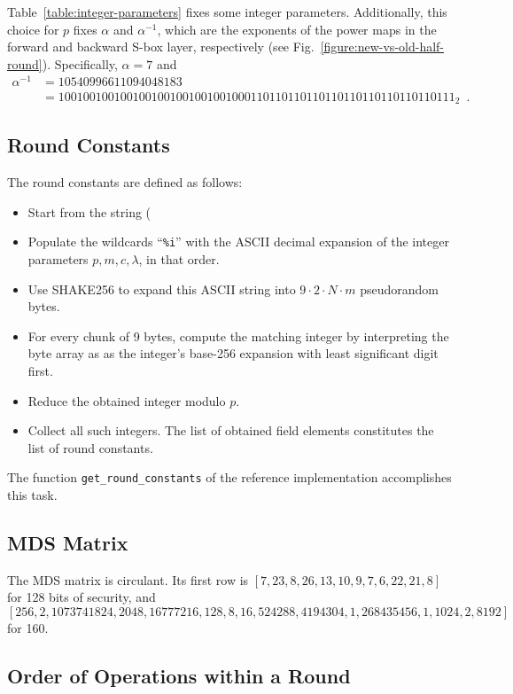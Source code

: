 \documentclass[a4paper]{article}
\begin{document}
Table~\ref{table:integer-parameters} fixes some integer parameters. Additionally, this choice for $p$ fixes $\alpha$ and $\alpha^{-1}$, which are the exponents of the power maps in the forward and backward S-box layer, respectively (see Fig.~\ref{figure:new-vs-old-half-round}). Specifically, $\alpha = 7$ and
\begin{align*}
\alpha^{-1} &= 10540996611094048183 \\
 &= 1001001001001001001001001001000110110110110110110110110110110111_2 \enspace .
\end{align*}

\subsection{Round Constants}

The round constants are defined as follows:
\begin{itemize}
\item Start from the string \verb@RPO(%i,%i,%i,%i)@.
\item Populate the wildcards ``\texttt{\%i}'' with the ASCII decimal expansion of the integer parameters $p, m, c, \lambda$, in that order.
\item Use SHAKE256 to expand this ASCII string into $9 \cdot 2 \cdot N \cdot m$ pseudorandom bytes.
\item For every chunk of 9 bytes, compute the matching integer by interpreting the byte array as as the integer's base-256 expansion with least significant digit first.
\item Reduce the obtained integer modulo $p$.
\item Collect all such integers. The list of obtained field elements constitutes the list of round constants.
\end{itemize}

The function \texttt{get\_round\_constants} of the reference implementation accomplishes this task.

\subsection{MDS Matrix}

The MDS matrix is circulant. Its first row is $[7, 23, 8, 26, 13, 10, 9, 7, 6, 22, 21, 8]$ for 128 bits of security, and 
$$ [256, 2, 1073741824, 2048, 16777216, 128, 8, 16, 524288, 4194304, 1, 268435456, 1, 1024, 2, 8192] $$
for 160.

\subsection{Order of Operations within a Round}
\end{document}
